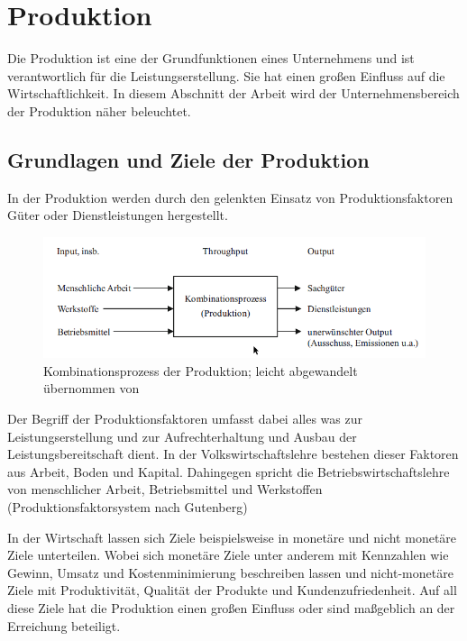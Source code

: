 \documentclass[a4paper,12pt, german]{report}
\begin{document}
\section{Produktion}

Die Produktion ist eine der Grundfunktionen eines Unternehmens und ist verantwortlich für die Leistungserstellung. Sie hat einen großen Einfluss auf die Wirtschaftlichkeit. In diesem Abschnitt der Arbeit wird der Unternehmensbereich der Produktion näher beleuchtet.

\subsection{Grundlagen und Ziele der Produktion}

In der Produktion werden durch den gelenkten Einsatz von Produktionsfaktoren Güter oder Dienstleistungen hergestellt. \cite{12}

\begin{figure}[H]
  \center
 \includegraphics[width=14cm]{images/Kombinationsprozess.png}
  \caption[Kombinationsprozess der Produktion]{Kombinationsprozess der Produktion; leicht abgewandelt übernommen von \cite{13} }
\end{figure}

Der Begriff der Produktionsfaktoren umfasst dabei alles was zur Leistungserstellung und zur Aufrechterhaltung und Ausbau der Leistungsbereitschaft dient. In der Volkswirtschaftslehre bestehen dieser Faktoren aus Arbeit, Boden und Kapital. Dahingegen spricht die Betriebswirtschaftslehre von menschlicher Arbeit, Betriebsmittel und Werkstoffen (Produktionsfaktorsystem nach Gutenberg)

In der Wirtschaft lassen sich Ziele beispielsweise in monetäre und nicht monetäre Ziele unterteilen. Wobei sich monetäre Ziele unter anderem mit Kennzahlen wie Gewinn, Umsatz und Kostenminimierung beschreiben lassen und nicht-monetäre Ziele mit Produktivität, Qualität der Produkte und Kundenzufriedenheit. Auf all diese Ziele hat die Produktion einen großen Einfluss oder sind maßgeblich an der Erreichung beteiligt.
\end{document}

